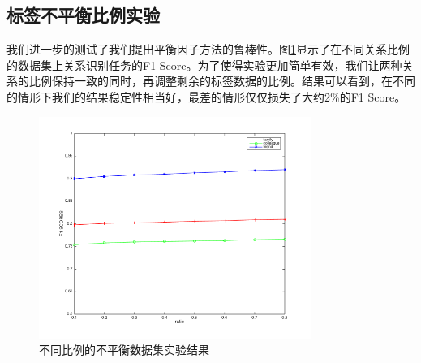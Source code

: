 \subsection{标签不平衡比例实验}
我们进一步的测试了我们提出平衡因子方法的鲁棒性。图\ref{fig-imbalance-ratio}显示了在不同关系比例的数据集上关系识别任务的F1 Score。为了使得实验更加简单有效，我们让两种关系的比例保持一致的同时，再调整剩余的标签数据的比例。结果可以看到，在不同的情形下我们的结果稳定性相当好，最差的情形仅仅损失了大约2\%的F1 Score。



\begin{figure}[ht]
    \centering
    \includegraphics[scale=1, width=0.79\textwidth]{figure/RatioPer.png}
    \caption{不同比例的不平衡数据集实验结果}
    \label{fig-imbalance-ratio}
\end{figure}


















































